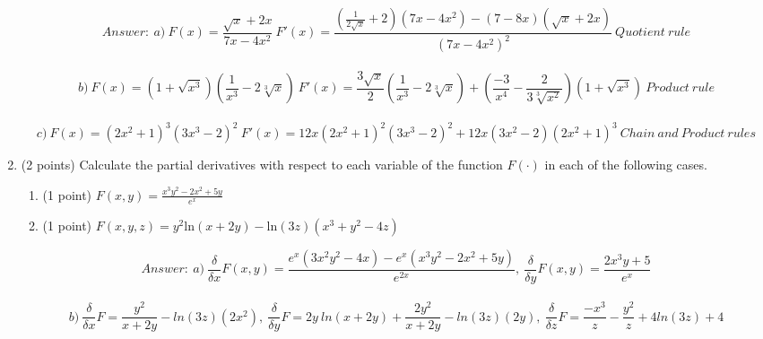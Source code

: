 \documentclass{article}%
\begin{document}
\begin{enumerate}
\begin{equation*} Answer: \ a) \ F(x) = \frac{\sqrt{x}+2x}{7x-4x^2} \ F'(x) = \frac{(\frac{1}{2\sqrt{x}} + 2)(7x - 4x^2) - (7 - 8x)(\sqrt{x} + 2x)}{(7x - 4x^2)^2} \ Quotient \ rule
\end{equation*} \\
\begin{equation*} b) \ F(x) = (1 + \sqrt{x^3})(\frac{1}{x^3} - 2\sqrt[3]{x}) \ F'(x) = \frac{3\sqrt{x}}{2}(\frac{1}{x^3} - 2\sqrt[3]{x}) + (\frac{-3}{x^4}-\frac{2}{3\sqrt[3]{x^2}})(1 + \sqrt{x^3}) \ Product \ rule
\end{equation*} \\
\begin{equation*} c) \ F(x) = (2x^2+1)^3(3x^3-2)^2 \ F'(x) = 12x(2x^2 + 1)^2(3x^3 - 2)^2 + 12x(3x^2 - 2)(2x^2 + 1)^3 \ Chain \ and \ Product \ rules
\end{equation*}

\item (2 points) Calculate the partial derivatives with respect to each variable of the function $F(\cdot)$ in each of the following cases.
\begin{enumerate}
    \item (1 point) $F(x,y) = \frac{x^3y^2 - 2x^2 + 5y}{e^x}$\\
    \item (1 point) $F(x,y,z) = y^2\mathrm{ln}(x+2y) -  \mathrm{ln}(3z)(x^3 + y^2 -4z)$
\end{enumerate}

\begin{equation*} Answer: \ a) \ \frac{\delta}{\delta x} F(x, y) = \frac{e^x(3x^2y^2 - 4x) - e^x(x^3y^2 - 2x^2 + 5y)}{e^{2x}}, \ \frac{\delta}{\delta y} F(x, y) = \frac{2x^3y + 5}{e^x}
\end{equation*} \\
\begin{equation*} b) \ \frac{\delta}{\delta x} F = \frac{y^2}{x + 2y} - ln(3z)(2x^2), \ \frac{\delta}{\delta y} F = 2y \ ln(x + 2y) + \frac{2y^2}{x + 2y} - ln(3z)(2y), \ \frac{\delta}{\delta z} F = \frac{-x^3}{z} - \frac{y^2}{z} + 4ln(3z) + 4
\end{equation*}



\end{enumerate}
\end{document}
